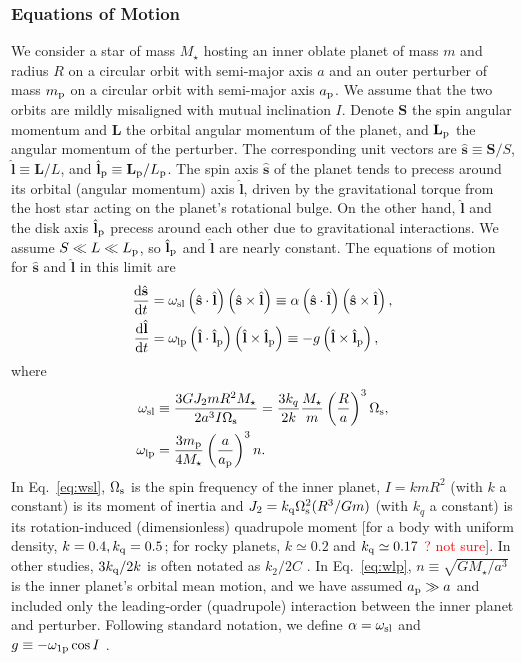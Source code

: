 \documentclass[
        fleqn,
        usenatbib,
    ]{mnras}
\newcommand*{\rd}[2]{\frac{\mathrm{d}#1}{\mathrm{d}#2}}
\newcommand*{\p}[1]{\left(#1\right)}
\newcommand*{\bm}[1]{\mathbf{#1}}
\newcommand*{\uv}[1]{\hat{\mathbf{#1}}}
\begin{document}
\subsubsection{Equations of Motion}

We consider a star of mass $M_\star$ hosting an inner oblate planet of mass $m$
and radius $R$ on a circular orbit with semi-major axis $a$ and an outer
perturber of mass $m_{\rm p}$ on a circular orbit with semi-major axis $a_{\rm
p}$. We assume that the two orbits are mildly misaligned with mutual inclination
$I$. Denote $\bm{S}$ the spin angular momentum and $\bm{L}$ the orbital angular
momentum of the planet, and $\bm{L}_{\rm p}$ the angular momentum of the
perturber. The corresponding unit vectors are $\uv{s} \equiv \bm{S} / S$,
$\uv{l} \equiv \bm{L} / L$, and $\uv{l}_{\rm p} \equiv \bm{L}_{\rm p} / L_{\rm
p}$. The spin axis $\uv{s}$ of the planet tends to precess around its orbital
(angular momentum) axis $\uv{l}$, driven by the gravitational torque from the
host star acting on the planet's rotational bulge. On the other hand, $\uv{l}$
and the disk axis $\uv{l}_{\rm p}$ precess around each other due to
gravitational interactions. We assume $S \ll L \ll L_{\rm p}$, so $\uv{l}_{\rm
p}$ and $\uv{l}$ are nearly constant. The equations of motion for $\uv{s}$ and
$\uv{l}$ in this limit are \citep{anderson2018teeter, su2020}
\begin{align}
    \rd{\uv{s}}{t}
        &= \omega_{\rm sl}\p{\uv{s} \cdot \uv{l}}\p{\uv{s} \times \uv{l}}
        \equiv \alpha\p{\uv{s} \cdot \uv{l}}\p{\uv{s} \times
        \uv{l}},\label{eq:dsdt1}\\
    \rd{\uv{l}}{t} &= \omega_{\rm lp}\p{\uv{l} \cdot \uv{l}_{\rm p}}\p{\uv{l}
        \times \uv{l}_{\rm p}} \equiv -g\p{\uv{l} \times \uv{l}_{\rm p}},
        \label{eq:dldt1}
\end{align}
where
\begin{align}
    \omega_{\rm sl} &\equiv \frac{3GJ_2 mR^2 M_\star}{2a^3 I\Omega_{\rm s}}
        = \frac{3k_q}{2k}\frac{M_\star}{m}\p{\frac{R}{a}}^3 \Omega_{\rm s},
            \label{eq:wsl}\\
    \omega_{\rm lp} &= \frac{3m_{\rm p}}{4M_\star}\p{\frac{a}{a_{\rm p}}}^3
        n.\label{eq:wlp}
\end{align}
In Eq.~\eqref{eq:wsl}, $\Omega_{\rm s}$ is the spin frequency of the inner
planet, $I = k mR^2$ (with $k$ a constant) is its moment of inertia and $J_2 =
k_{\rm q}\Omega_{\rm s}^2 (R^3/Gm)$ (with $k_{q}$ a constant) is its rotation-induced
(dimensionless) quadrupole moment [for a body with uniform density, $k=0.4,
k_{\rm q}=0.5$; for rocky planets, $k\simeq 0.2$ and $k_{\rm q}\simeq 0.17$
\citep[e.g.][]{lainey2016quantification} \textcolor{red}{? not sure}]. In other
studies, $3k_{\rm q} / 2 k$ is often notated as $k_2 / 2C$
\citep[e.g.][]{millholland_disk}. In Eq.~\eqref{eq:wlp}, $n \equiv
\sqrt{GM_\star/a^3}$ is the inner planet's orbital mean motion,  and we have
assumed $a_{\rm p}\gg a$ and included only the leading-order (quadrupole)
interaction between the inner planet and perturber. Following standard notation,
we define $\alpha = \omega_{\rm sl}$ and $g \equiv -\omega_{\rm 1p} \cos I$
\citep[e.g.][]{colombo1966}.
\end{document}
